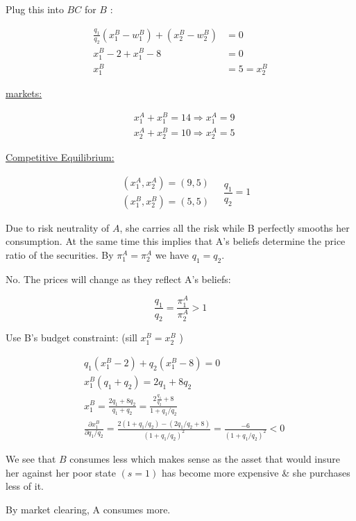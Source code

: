 {\begin{enumerate}[label=(\alph*)]
{Plug this into $B C$ for $B$ :

$$
\begin{aligned}
\frac{q_1}{q_2}\left(x_{1}^{B}-w_{1}^{B}\right)+\left(x_{2}^{B}-w_{2}^{B}\right) & =0 \\
x_{1}^{B}-2+x_{1}^{B}-8 & =0 \\
x_{1}^{B} & =5=x_{2}^{B}
\end{aligned}
$$

\underline{markets:}

$$
\begin{aligned}
& x_{1}^{A}+x_{1}^{B}=14 \Rightarrow x_{1}^{A}=9 \\
& x_{2}^{A}+x_{2}^{B}=10 \Rightarrow x_{2}^{A}=5
\end{aligned}
$$

\underline{Competitive Equilibrium:}

$$
\begin{array}{ll}
& \left(x_{1}^{A}, x_{2}^{A}\right)=(9,5) \\
& \left(x_{1}^{B}, x_{2}^{B}\right)=(5,5)
\end{array} \quad \frac{q_{1}}{q_{2}}=1
$$

Due to risk neutrality of $A$, she carries all the risk while B perfectly smooths her consumption. At the same time this implies that A's beliefs determine the price ratio of the securities. By $\pi_{1}^{A}=\pi_{2}^{A}$ we have $q_{1}=q_{2}$.
}
{\item 
No. The prices will change as they reflect A's beliefs:

$$
\frac{q_{1}}{q_{2}}=\frac{\pi_{1}^{A}}{\pi_{2}^{A}}>1
$$

Use B's budget constraint: (sill $x_{1}^{B}=x_{2}^{B}$ )

$$
\begin{aligned}
& q_{1}\left(x_{1}^{B}-2\right)+q_{2}\left(x_{1}^{B}-8\right)=0 \\
& x_{1}^{B}\left(q_{1}+q_{2}\right)=2 q_{1}+8 q_{2} \\
& x_{1}^{B}=\frac{2 q_{1}+8 q_{2}}{q_{1}+q_{2}}=\frac{2\frac{q_1}{q_{2}}+8}{1+q_{1}/ q_{2}} \\
& \frac{\partial x_{1}^{B}}{\partial q_{1}/ q_{2}}=\frac{2\left(1+q_{1}/ q_{2}\right)-\left(2 q_{1}/ q_{2}+8\right)}{\left(1+q_{1}/ q_{2}\right)^{2}}=\frac{-6}{\left(1+q_{1}/q_{2}\right)^{2}}<0
\end{aligned}
$$

We see that $B$ consumes less which makes sense as the asset that would insure her against her poor state $(s=1)$ has become more expensive \& she purchases less of it.

By market clearing, A consumes more.
}
\end{enumerate}
}

